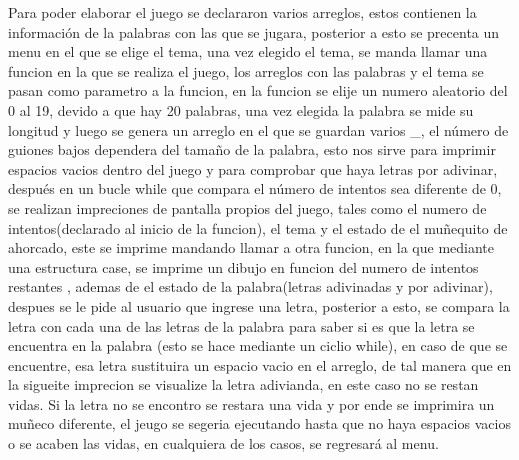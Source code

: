 \documentclass[12pt,a4paper]{article}
\begin{document}
Para poder elaborar el juego se declararon varios arreglos, estos contienen la información de la palabras con las que se jugara, posterior a esto se precenta un menu en el que se elige el tema, una vez elegido el tema, se manda llamar una funcion en la que se realiza el juego, los arreglos con las palabras y el tema se pasan como parametro a la funcion, en la funcion se elije un numero aleatorio del 0 al 19, devido a que hay 20 palabras, una vez elegida la palabra se mide su longitud y luego se genera un arreglo en el que se guardan varios \_, el número de guiones bajos dependera del tamaño de la palabra, esto nos sirve para imprimir espacios vacios dentro del juego y para comprobar que haya letras por adivinar, después en un bucle while que compara el número de intentos sea diferente de 0, se realizan impreciones de pantalla propios del juego, tales como el numero de intentos(declarado al inicio de la funcion), el tema y el estado de el muñequito de ahorcado, este se imprime mandando llamar a otra funcion, en la que mediante una estructura case, se imprime un dibujo en funcion del numero de intentos restantes , ademas de el estado de la palabra(letras adivinadas y por adivinar), despues se le pide al usuario que ingrese una letra, posterior a esto, se compara la letra con cada una de las letras de la palabra para saber si es que la letra se encuentra en la palabra (esto se hace mediante un ciclio while), en caso de que se encuentre, esa letra sustituira un espacio vacio en el arreglo, de tal manera que en la sigueite imprecion se visualize la letra adivianda, en este caso no se restan vidas. Si la letra no se encontro se restara una vida y por ende se imprimira un muñeco diferente, el jeugo se segeria ejecutando hasta que no haya espacios vacios o se acaben las vidas, en cualquiera de los casos, se regresará al menu.
\justifying
\end{document}
